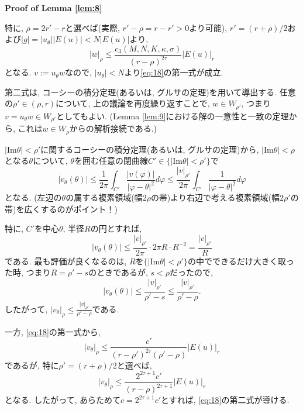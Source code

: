 \documentclass[a4paper]{ujarticle}
\makeatletter
\numberwithin{equation}{section}
\theoremstyle{definition}
\renewenvironment{proof}[1][Proof]{\par
  \pushQED{\qed}%
  \normalfont \topsep6\p@\@plus6\p@\relax
  \trivlist
  \item\relax
  {\bfseries
  #1\@addpunct{.}}\hspace\labelsep\ignorespaces
}{%
  \popQED\endtrivlist\@endpefalse
}
\makeatother
\begin{document}
\begin{proof}[Proof of Lemma \ref{lem:8}]
            特に, $\rho = 2r' - r$と選べば(実際, $r' - \rho = r - r' > 0$より可能), 
            $r' = (r + \rho)/2$および$|g| = |u_{\theta}| |E(u)| < N |E(u)|$より, 
            \begin{equation} \label{eq:28}
                |w|_{\rho} \leq \frac{c_3(M, N, K, \kappa, \sigma)}{(r - \rho)^{2\tau}}|E(u)|_{r}
            \end{equation}
            となる.
            $v := u_{\theta} w$なので, $|u_{\theta}| < N$より\eqref{eq:18}の第一式が成立.

            第二式は, コーシーの積分定理(あるいは, グルサの定理)を用いて導出する.
            任意の$\rho' \in (\rho, r)$について, 上の議論を再度繰り返すことで, $w \in W_{\rho'}$, 
            つまり$v = u_{\theta} w \in W_{\rho'}$としてもよい. 
            (Lemma \ref{lem:9}における解の一意性と一致の定理から, これは$w \in W_{\rho}$からの解析接続である.)

            $|\mathrm{Im} \theta | < \rho'$に関するコーシーの積分定理(あるいは, グルサの定理)から, 
            $|\mathrm{Im} \theta | < \rho$となる$\theta$について, 
            $\theta$を囲む任意の閉曲線$C' \in \{|\mathrm{Im} \theta | < \rho'\}$で
            \[
                |v_{\theta}(\theta)| \leq \frac{1}{2 \pi} \int_{C'} \frac{|v(\varphi)|}{|\varphi - \theta|^2} d \varphi \leq \frac{|v|_{\rho'}}{2 \pi} \int_{C'} \frac{1}{|\varphi - \theta|^2} d \varphi
            \]
            となる. (左辺の$\theta$の属する複素領域(幅$2 \rho$の帯)より右辺で考える複素領域(幅$2 \rho'$の帯)を広くするのがポイント！)

            特に, $C'$を中心$\theta$, 半径$R$の円とすれば, 
            \[
                |v_{\theta}(\theta)| \leq \frac{|v|_{\rho'}}{2 \pi} \cdot 2 \pi R \cdot R^{-2} = \frac{|v|_{\rho'}}{R}
            \]
            である. 最も評価が良くなるのは, $R$を$\{|\mathrm{Im} \theta | < \rho'\}$の中でできるだけ大きく取った時, 
            つまり$R = \rho' - s$のときであるが, $s < \rho$だったので, 
            \[
                |v_{\theta}(\theta)| \leq \frac{|v|_{\rho'}}{\rho' - s} \leq \frac{|v|_{\rho'}}{\rho' - \rho}.
            \]
            したがって, $|v_{\theta}|_{\rho} \leq \displaystyle \frac{|v|_{\rho'}}{\rho' - \rho}$である.

            一方, \eqref{eq:18}の第一式から,
            \[
                |v_{\theta}|_{\rho} \leq \frac{c'}{(r - \rho')^{2 \tau}(\rho' - \rho)} |E(u)|_{r}
            \]
            であるが, 特に$\rho' = (r + \rho)/2$と選べば,
            \[
                |v_{\theta}|_{\rho} \leq \frac{2^{2 \tau + 1} c'}{(r - \rho)^{2 \tau + 1}} |E(u)|_{r}
            \]
            となる. したがって, あらためて$c = 2^{2 \tau + 1} c'$とすれば, \eqref{eq:18}の第二式が導ける.
        \end{proof}
        
\end{document}
